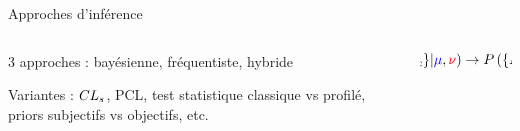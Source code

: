 \begin{frame}
\vspace*{-0.1cm}
\pause
\begin{block}{Approches d'inférence}
\begin{columns}
\begin{column}{0.65\textwidth}
\begin{maliste}
\item 3 approches : bayésienne, fréquentiste, hybride
\vspace*{0.1cm}
\item Variantes : $CL_s$, PCL, test statistique classique vs profilé, priors subjectifs vs objectifs, etc.
\end{maliste}
\end{column}
\begin{column}{0.35\textwidth}
\[
\hspace*{-1cm}
P\left(\{\nc\}|\textcolor{blue}{\mu},\textcolor{red}{\nu}\right)\rightarrow P\left(\{\nc\}|\textcolor{blue}{\mu}\right)\]
\end{column}
\end{columns}
\end{block}

\end{frame}

